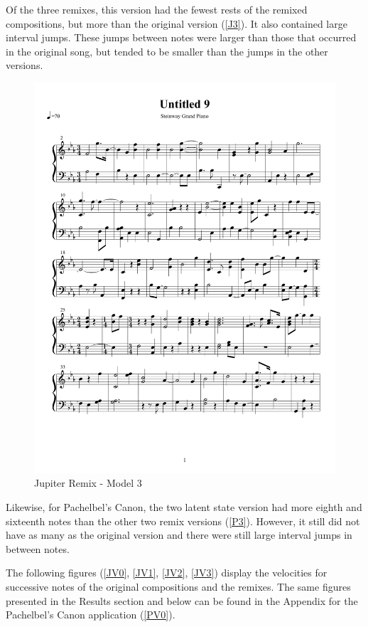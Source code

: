 \documentclass{article} %
\begin{document}
Of the three remixes, this version had the fewest rests of the remixed compositions, but more than the original version (\autoref{J3}). It also contained large interval jumps. These jumps between notes were larger than those that occurred in the original song, but tended to be smaller than the jumps in the other versions. 


\begin{figure}[H]
\centering

\includegraphics [scale = 0.6] {JupiterRemix2H-cropped.pdf}
\caption{Jupiter Remix - Model 3\label{J3}}
\end{figure}

Likewise, for Pachelbel's Canon, the two latent state version had more eighth and sixteenth notes than the other two remix versions (\autoref{P3}). However, it still did not have as many as the original version and there were still large interval jumps in between notes. 

The following figures (\autoref{JV0}, \autoref{JV1}, \autoref{JV2}, \autoref{JV3}) display the velocities for successive notes of the original compositions and the remixes. The same figures presented in the Results section and below can be found in the Appendix for the Pachelbel's Canon application (\autoref{PV0}). 
\end{document}
